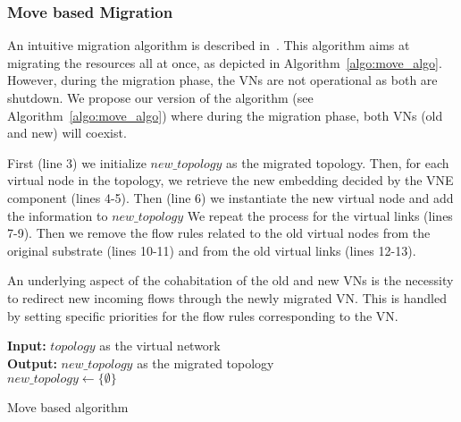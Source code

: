 \subsubsection{Move based Migration}
\label{sec:move-algo}

An intuitive migration algorithm is described in~\cite{Lime-Ghorbani2014}. 
This algorithm aims at migrating the resources all at once, as depicted in Algorithm~\ref{algo:move_algo}.
However, during the migration phase, the VNs are not operational as both are shutdown.
We propose our version of the algorithm (see Algorithm~\ref{algo:move_algo}) where during the migration phase, both VNs (old and new) will coexist.

First (line 3) we initialize $new\_topology$ as the migrated topology. Then, for each virtual node in the topology, we retrieve the new embedding decided by the VNE component (lines 4-5).
Then (line 6) we instantiate the new virtual node and add the information to $new\_topology$
We repeat the process for the virtual links (lines 7-9).
Then we remove the flow rules related to the old virtual nodes from the original substrate (lines 10-11) and from the old virtual links (lines 12-13).

An underlying aspect of the cohabitation of the old and new VNs is the necessity to redirect new incoming flows through the newly migrated VN.
This is handled by setting specific priorities for the flow rules corresponding to the VN.


\begin{algorithm}[ht]
\textbf{Input: }$topology$ as the virtual network\\
\textbf{Output: } $new\_topology$ as the migrated topology\\
$new\_topology \gets \{\emptyset\}$\\
\caption{Move based algorithm}
\label{algo:move_algo}
\end{algorithm}


